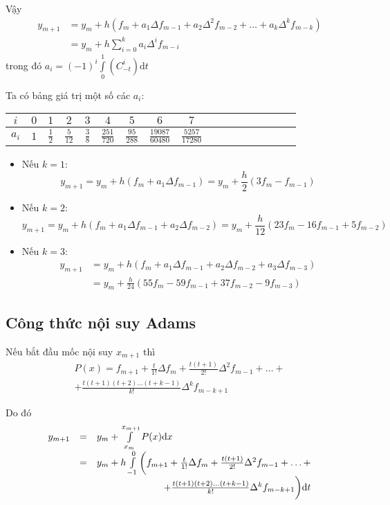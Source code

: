 Vậy
\begin{align*}
	y_{m+1}&=y_m+h\left(f_m+a_1\Delta f_{m-1}+a_2\Delta^2 f_{m-2}+\ldots+a_k\Delta^k f_{m-k}\right)\\
	       &=y_m+h\sum_{i=0}^k a_i\Delta^i f_{m-i}
\end{align*}
trong đó $a_i=(-1)^i\int\limits_{0}^{1}(C_{-t}^i)\mathrm{d}t$

Ta có bảng giá trị một số các $a_i$:
\begin{longtable}{|c|Sc|Sc|Sc|Sc|Sc|Sc|Sc|Sc|}\hline
	$i$   & $0$ & $1$       & $2$            & $3$       & $4$               & $5$              & $6$                   & $7$\\\hline
	\endhead
	$a_i$ & $1$ & $\frac12$ & $\frac{5}{12}$ & $\frac38$ & $\frac{251}{720}$ & $\frac{95}{288}$ & $\frac{19087}{60480}$ & $\frac{5257}{17280}$\\\hline
\end{longtable}
\begin{itemize}
	\item Nếu $k=1$:
		$$y_{m+1}=y_m+h(f_m+a_1\Delta f_{m-1})=y_m+\frac{h}{2}(3f_m-f_{m-1})$$
	\item Nếu $k=2$:
		$$y_{m+1}=y_m+h(f_m+a_1\Delta f_{m-1}+a_2\Delta f_{m-2})=y_m+\frac{h}{12}(23f_m-16f_{m-1}+5f_{m-2})$$
	\item Nếu $k=3$:
		\begin{align*}
			y_{m+1}&=y_m+h(f_m+a_1\Delta f_{m-1}+a_2\Delta f_{m-2}+a_3\Delta f_{m-3})\\
			&=y_m+\frac{h}{24}(55f_m-59f_{m-1}+37f_{m-2}-9f_{m-3})
		\end{align*}
\end{itemize}

\subsection{Công thức nội suy Adams}

Nếu bắt đầu mốc nội suy $x_{m+1}$ thì
\begin{multline*}
	P(x)=f_{m+1}+\frac{t}{1!}\Delta f_m+\frac{t(t+1)}{2!} \Delta^2 f_{m-1}+\ldots+\\
	+\frac{t(t+1)(t+2)\ldots(t+k-1)}{k!} \Delta^k f_{m-k+1}
\end{multline*}

Do đó
$$\begin{array}{rcl}
	y_{m+1} & = & y_m+\int\limits_{x_m}^{x_{m+1}} P(x)\mathrm{d}x\\
	        & = & y_m+h\int\limits_{-1}^{0}\bigg(f_{m+1}+\frac{t}{1!}\Delta f_m+\frac{t(t+1)}{2!} \Delta^2 f_{m-1}+\ldots+\\
	        &   & \hfill+\frac{t(t+1)(t+2)\ldots(t+k-1)}{k!} \Delta^k f_{m-k+1}\bigg)\mathrm{d}t
\end{array}$$


